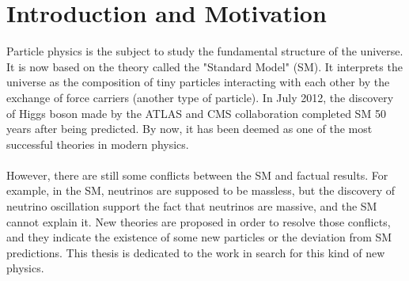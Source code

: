 \chapter{Introduction and Motivation}
Particle physics is the subject to study the fundamental structure of the universe. It is now based on the theory called the "Standard Model" (SM). It interprets the universe as the composition of tiny particles interacting with each other by the exchange of force carriers (another type of particle).  In July 2012, the discovery of Higgs boson made by the ATLAS and CMS collaboration completed SM 50 years after being predicted. By now, it has been deemed as one of the most successful theories in modern physics.
\\
\\
However, there are still some conflicts between the SM and factual results. For example, in the SM, neutrinos are supposed to be massless, but the discovery of neutrino oscillation support the fact that neutrinos are massive, and the SM cannot explain it. New theories are proposed in order to resolve those conflicts, and they indicate the existence of some new particles or the deviation from SM predictions. This thesis is dedicated to the work in search for this kind of new physics.  
